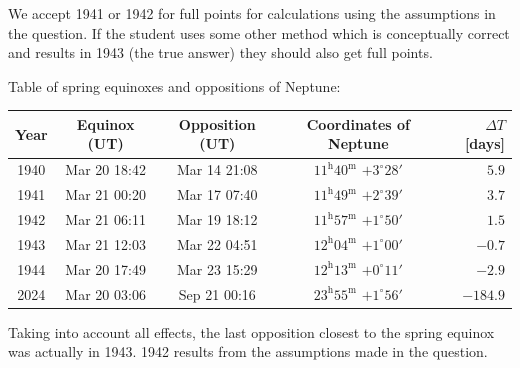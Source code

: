 We accept 1941 or 1942 for full points for calculations using the assumptions
in the question. If the student uses some other method which is conceptually
correct and results in 1943 (the true answer) they should also get full
points.

\medskip
Table of spring equinoxes and oppositions of Neptune:

\begin{center}
\begin{tabular}{|c|c|c|c|r|}
\hline
Year & Equinox (UT) & Opposition (UT) & Coordinates of Neptune
  & $\Delta T$ [days]\\
\hline
1940 & Mar 20 18:42 & Mar 14 21:08
  & $11^{\mathrm{h}}40^{\mathrm{m}}$ $+3^\circ 28'$ & $5.9$\\
1941 & Mar 21 00:20 & Mar 17 07:40
  & $11^{\mathrm{h}}49^{\mathrm{m}}$ $+2^\circ 39'$ & $3.7$\\
1942 & Mar 21 06:11 & Mar 19 18:12
  & $11^{\mathrm{h}}57^{\mathrm{m}}$ $+1^\circ 50'$ & $1.5$\\
1943 & Mar 21 12:03 & Mar 22 04:51
  & $12^{\mathrm{h}}04^{\mathrm{m}}$ $+1^\circ 00'$ & $-0.7$\\
1944 & Mar 20 17:49 & Mar 23 15:29
  & $12^{\mathrm{h}}13^{\mathrm{m}}$ $+0^\circ 11'$ & $-2.9$\\
\hline
2024 & Mar 20 03:06 & Sep 21 00:16
  & $23^{\mathrm{h}}55^{\mathrm{m}}$ $+1^\circ 56'$ & $-184.9$\\
\hline
\end{tabular}
\end{center}

Taking into account all effects, the last opposition closest to the spring
equinox was actually in 1943. 1942 results from the assumptions made in the
question.

